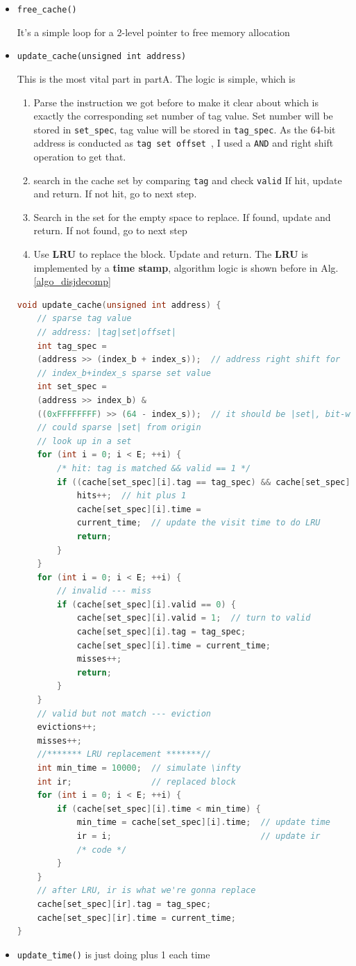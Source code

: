 \documentclass{article}
\begin{document}
\begin{itemize}
\item \lstinline|free_cache()|

It's a simple loop for a 2-level pointer to free memory allocation

\item \lstinline|update_cache(unsigned int address)|

{\color{red} This is the most vital part in partA}. The logic is simple, which is 
\begin{enumerate}
	\item Parse the instruction we got before to make it clear about which is exactly the corresponding set number of tag value. Set number will be stored in \lstinline|set_spec|, tag value will be stored in \lstinline|tag_spec|. As the 64-bit address is conducted as \lstinline|tag set offset |, I used a \lstinline|AND| and right shift operation to get that.
	\item search in the cache set by comparing \lstinline|tag| and check \lstinline|valid|
	\subitem If hit, update and return.
	\subitem If not hit, go to next step.
	\item Search in the set for the empty space to replace.
	\subitem If found, update and return.
	\subitem If not found, go to next step
	\item Use \textbf{LRU} to replace the block. Update and return. The \textbf{LRU} is implemented by a \textbf{time stamp}, algorithm logic is shown before in Alg.\ref{algo_disjdecomp}
\end{enumerate}
	\begin{lstlisting}[language=c]
void update_cache(unsigned int address) {
	// sparse tag value
	// address: |tag|set|offset|
	int tag_spec =
	(address >> (index_b + index_s));  // address right shift for
	// index_b+index_s sparse set value
	int set_spec =
	(address >> index_b) &
	((0xFFFFFFFF) >> (64 - index_s));  // it should be |set|, bit-wise AND
	// could sparse |set| from origin
	// look up in a set
	for (int i = 0; i < E; ++i) {
		/* hit: tag is matched && valid == 1 */
		if ((cache[set_spec][i].tag == tag_spec) && cache[set_spec][i].valid == 1) {
			hits++;  // hit plus 1
			cache[set_spec][i].time =
			current_time;  // update the visit time to do LRU
			return;
		}
	}
	for (int i = 0; i < E; ++i) {
		// invalid --- miss
		if (cache[set_spec][i].valid == 0) {
			cache[set_spec][i].valid = 1;  // turn to valid
			cache[set_spec][i].tag = tag_spec;
			cache[set_spec][i].time = current_time;
			misses++;
			return;
		}
	}
	// valid but not match --- eviction
	evictions++;
	misses++;
	//******* LRU replacement *******//
	int min_time = 10000;  // simulate \infty
	int ir;                // replaced block
	for (int i = 0; i < E; ++i) {
		if (cache[set_spec][i].time < min_time) {
			min_time = cache[set_spec][i].time;  // update time
			ir = i;                              // update ir
			/* code */
		}
	}
	// after LRU, ir is what we're gonna replace
	cache[set_spec][ir].tag = tag_spec;
	cache[set_spec][ir].time = current_time;
}
	\end{lstlisting}
\item \lstinline|update_time()| is just doing plus 1 each time
\end{itemize}
\end{document}

